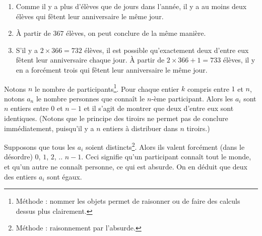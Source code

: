 \begin{Soln}{2}
\begin{enumerate}
\item
Comme il y a plus d'élèves que de jours dans l'année, il y a au moins deux élèves qui fêtent leur anniversaire le même jour.

\item À partir de $367$ élèves, on peut conclure de la même manière.

\item S'il y a $2\times 366=732$ élèves, il est possible qu'exactement deux d'entre eux fêtent leur anniversaire chaque jour. À partir de $2\times 366+1=733$ élèves, il y en a forcément trois qui fêtent leur anniversaire le même jour.
\end{enumerate}
\end{Soln}
\begin{Soln}{4}
Notons $n$ le nombre de participants\footnote{Méthode : nommer les objets permet de raisonner ou de faire des calculs dessus plus clairement.}. Pour chaque entier $k$ compris entre $1$ et $n$, notons $a_n$ le nombre personnes que connaît le $n$-ème participant. Alors les $a_i$ sont $n$ entiers entre $0$ et $n-1$ et il s'agit de montrer que deux d'entre eux sont identiques. (Notons que le principe des tiroirs ne permet pas de conclure immédiatement, puisqu'il y a $n$ entiers à distribuer dans $n$ tiroirs.)

Supposons que tous les $a_i$ soient distincts\footnote{Méthode : raisonnement par l'absurde.}. Alors ils valent forcément (dans le désordre) $0$, $1$, $2$, .. $n-1$. Ceci signifie qu'un participant connaît tout le monde, et qu'un autre ne connaît personne, ce qui est absurde. On en déduit que deux des entiers $a_i$ sont égaux.
\end{Soln}
